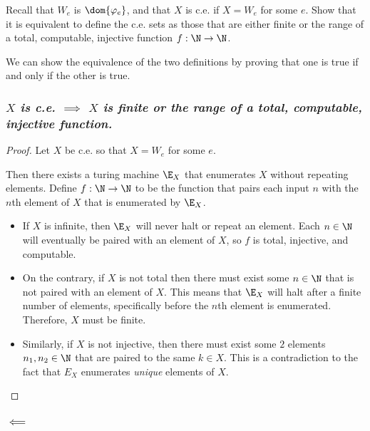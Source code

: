 \begin{problem}
  Recall that $W_e$ is $\dom{\varphi_e}$, and that $X$ is c.e. if
  $X = W_e$ for some $e$. Show that it is equivalent to define
  the c.e. sets as those that are either finite or the range
  of a total, computable, injective function
  $f : \N \to \N$.

  \begin{answer}
    We can show the equivalence of the two definitions by proving that
    one is true if and only if the other is true.
    \subsubsection*{\emph{
        $X$ is c.e. $\implies$ $X$ is finite or the range of a
        total, computable, injective function.
      }
    }

      \begin{proof}
        Let $X$ be c.e. so that $X = W_e$ for some $e$.

        Then there exists a turing machine $\E_X$ that enumerates $X$ without repeating elements.
        Define $f : \N \to \N$ to be the function that pairs each input $n$ with
        the $n$th element of $X$ that is enumerated by $\E_X$.

        \begin{itemize}
          \item If $X$ is infinite, then $\E_X$ will never halt or repeat an element.
            Each $n \in \N$ will eventually be paired with an element of $X$,
            so $f$ is total, injective, and computable.
          \item On the contrary, if $X$ is not total then there must
            exist some $n \in \N$ that is not paired with an element of $X$.
            This means that $\E_X$ will halt after a finite number of elements,
            specifically before the $n$th element is enumerated.
            Therefore, $X$ must be finite.
          \item Similarly, if $X$ is not injective, then there must exist
            some $2$ elements $n_1, n_2 \in \N$ that are paired to the same
            $k \in X$. This is a contradiction to the fact that
            $E_X$ enumerates \emph{unique} elements of $X$.
        \end{itemize}
      \end{proof}

    \subsubsection*{$\impliedby$}


\end{answer}
\end{problem}

